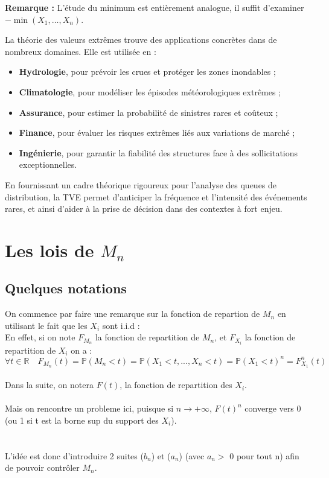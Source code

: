 \documentclass{article}
\begin{document}
\medskip
\noindent
\textbf{Remarque :} L’étude du minimum est entièrement analogue, il suffit d’examiner $-\min(X_1, \dots, X_n)$.

\medskip
\noindent
La théorie des valeurs extrêmes trouve des applications concrètes dans de nombreux domaines. Elle est utilisée en :
\begin{itemize}
    \item \textbf{Hydrologie}, pour prévoir les crues et protéger les zones inondables ;
    \item \textbf{Climatologie}, pour modéliser les épisodes météorologiques extrêmes ;
    \item \textbf{Assurance}, pour estimer la probabilité de sinistres rares et coûteux ;
    \item \textbf{Finance}, pour évaluer les risques extrêmes liés aux variations de marché ;
    \item \textbf{Ingénierie}, pour garantir la fiabilité des structures face à des sollicitations exceptionnelles.
\end{itemize}

En fournissant un cadre théorique rigoureux pour l’analyse des queues de distribution, la TVE permet d’anticiper la fréquence et l’intensité des événements rares, et ainsi d’aider à la prise de décision dans des contextes à fort enjeu.

\section{Les lois de $M_n$}

\subsection{Quelques notations }

On commence par faire une remarque sur la fonction de repartion de $M_n$ en utilisant le fait que les $X_i$ sont i.i.d :
\\
En effet, si on note $F_{M_n}$ la fonction de repartition de $M_n$, et $F_{X_i}$ la fonction de repartition de $X_i$ on a :
\[
\forall t \in \mathbb{R} \quad F_{M_n}(t) = \mathbb{P}(M_n < t) = \mathbb{P}(X_1 < t,...,X_n <t)=\mathbb{P}(X_1<t)^n = F_{X_1}^n(t) 
\]
\\
Dans la suite, on notera $F(t)$, la fonction de repartition des $X_i$.
\\
\\
Mais on rencontre un probleme ici, puisque si $n\to + \infty$, $F(t)^n$ converge vers 0 (ou 1 si t est la borne sup du support des $X_i$).
\\
\\
\\
L'idée est donc d'introduire 2 suites ($b_n$) et ($a_n$) (avec $a_n > $  0 pour tout n) afin de pouvoir contrôler $M_n$.
\end{document}
